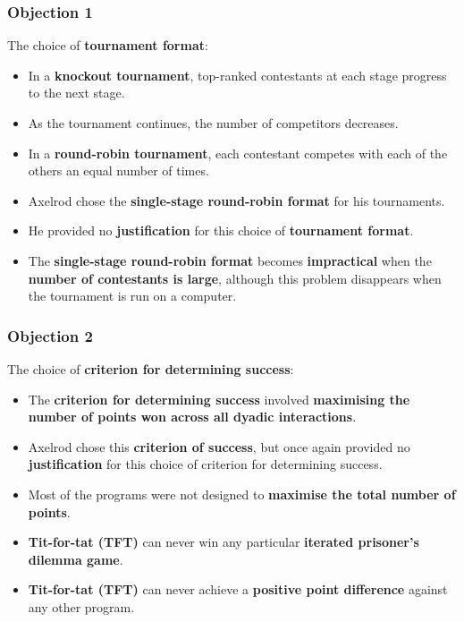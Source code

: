 \documentclass[11pt]{article}
\begin{document}
\subsubsection{Objection 1}
\label{sec:org2033f73}
The choice of \textbf{tournament format}:
\begin{itemize}
\item In a \textbf{knockout tournament}, top-ranked contestants at each stage progress to the next stage.
\item As the tournament continues, the number of competitors decreases.
\item In a \textbf{round-robin tournament}, each contestant competes with each of the others an equal number of times.
\item Axelrod chose the \textbf{single-stage round-robin format} for his tournaments.
\item He provided no \textbf{justification} for this choice of \textbf{tournament format}.
\item The \textbf{single-stage round-robin format} becomes \textbf{impractical} when the \textbf{number of contestants is large}, although this problem disappears when the tournament is run on a computer.
\end{itemize}
\subsubsection{Objection 2}
\label{sec:orgf0f1140}
The choice of \textbf{criterion for determining success}:
\begin{itemize}
\item The \textbf{criterion for determining success} involved \textbf{maximising the number of points won across all dyadic interactions}.
\item Axelrod chose this \textbf{criterion of success}, but once again provided no \textbf{justification} for this choice of criterion for determining success.
\item Most of the programs were not designed to \textbf{maximise the total number of points}.
\item \textbf{Tit-for-tat (TFT)} can never win any particular \textbf{iterated prisoner's dilemma game}.
\item \textbf{Tit-for-tat (TFT)} can never achieve a \textbf{positive point difference} against any other program.
\end{itemize}
\end{document}
